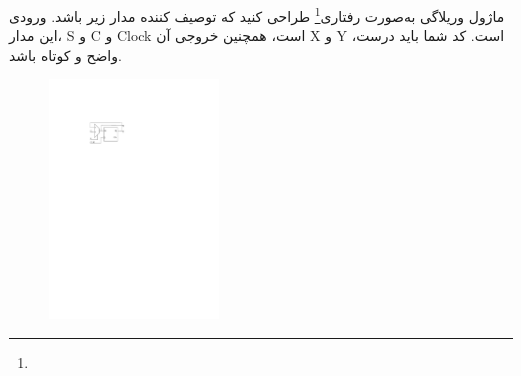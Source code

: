 

ماژول وریلاگی به‌صورت رفتاری\footnote{} طراحی کنید که توصیف کننده مدار زیر باشد. ورودی این مدار، S و C و Clock است، همچنین خروجی آن X و Y است. کد شما باید درست، واضح و کوتاه باشد.

\begin{figure}[h]
	\centering
	\includegraphics[width=0.4\textwidth]{fig/Q_bunos_2.pdf}
	\label{fig:Q_bunos_2}
\end{figure}

